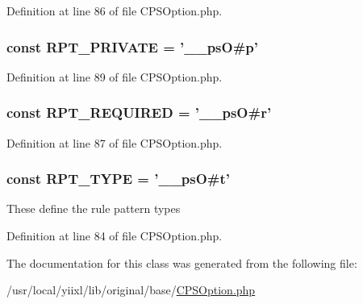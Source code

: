Definition at line 86 of file CPSOption.php.

\hypertarget{classCPSOption_a1269232ea10c2579723e52653047616c}{
\subsubsection[{RPT\_\-PRIVATE}]{\setlength{\rightskip}{0pt plus 5cm}const {\bf RPT\_\-PRIVATE} = '\_\-\_\-psO\#p'}}
\label{classCPSOption_a1269232ea10c2579723e52653047616c}


Definition at line 89 of file CPSOption.php.

\hypertarget{classCPSOption_a16a4aecf79ed0a222f179f0e44404099}{
\subsubsection[{RPT\_\-REQUIRED}]{\setlength{\rightskip}{0pt plus 5cm}const {\bf RPT\_\-REQUIRED} = '\_\-\_\-psO\#r'}}
\label{classCPSOption_a16a4aecf79ed0a222f179f0e44404099}


Definition at line 87 of file CPSOption.php.

\hypertarget{classCPSOption_aa978b1a784800b7a941c6a5871f77e2b}{
\subsubsection[{RPT\_\-TYPE}]{\setlength{\rightskip}{0pt plus 5cm}const {\bf RPT\_\-TYPE} = '\_\-\_\-psO\#t'}}
\label{classCPSOption_aa978b1a784800b7a941c6a5871f77e2b}
These define the rule pattern types 

Definition at line 84 of file CPSOption.php.



The documentation for this class was generated from the following file:\begin{DoxyCompactItemize}
\item 
/usr/local/yiixl/lib/original/base/\hyperlink{CPSOption_8php}{CPSOption.php}\end{DoxyCompactItemize}
